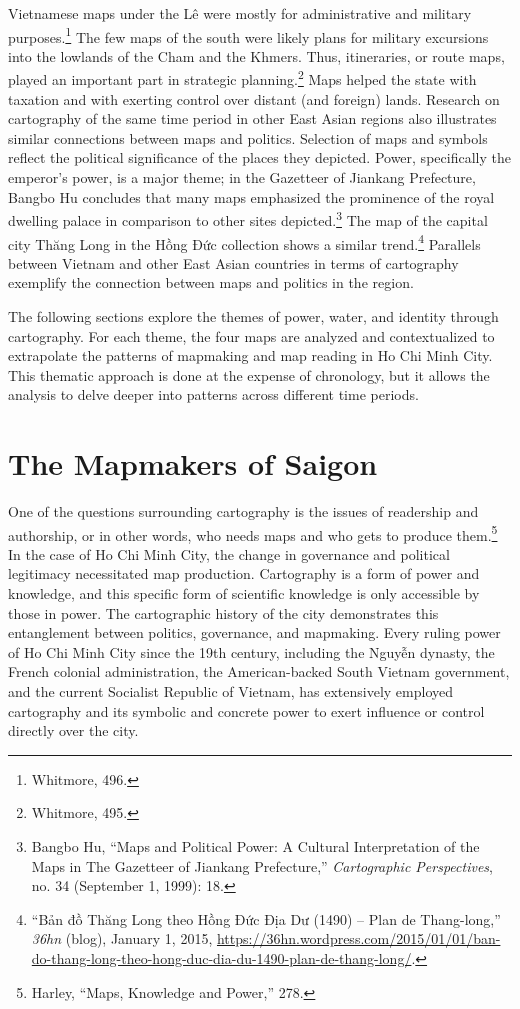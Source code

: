 \vi Vietnamese maps under the Lê were mostly for administrative and military purposes.\footnote{Whitmore, 496.} The few maps of the south were likely plans for military excursions into the lowlands of the Cham and the Khmers. Thus, itineraries, or route maps, played an important part in strategic planning.\footnote{Whitmore, 495.} Maps helped the state with taxation and with exerting control over distant (and foreign) lands. Research on cartography of the same time period in other East Asian regions also illustrates similar connections between maps and politics. Selection of maps and symbols reflect the political significance of the places they depicted. Power, specifically the emperor's power, is a major theme; in the Gazetteer of Jiankang Prefecture, Bangbo Hu concludes that many maps emphasized the prominence of the royal dwelling palace in comparison to other sites depicted.\footnote{Bangbo Hu, “Maps and Political Power: A Cultural Interpretation of the Maps in The Gazetteer of Jiankang Prefecture,” \textit{Cartographic Perspectives}, no. 34 (September 1, 1999): 18.}  The map of the capital city Thăng Long in the Hồng Đức collection shows a similar trend.\footnote{“Bản đồ Thăng Long theo Hồng Đức Địa Dư (1490) – Plan de Thang-long,” \textit{36hn} (blog), January 1, 2015, \url{https://36hn.wordpress.com/2015/01/01/ban-do-thang-long-theo-hong-duc-dia-du-1490-plan-de-thang-long/}.} Parallels between Vietnam and other East Asian countries in terms of cartography exemplify the connection between maps and politics in the region.

The following sections explore the themes of power, water, and identity through cartography. For each theme, the four maps are analyzed and contextualized to extrapolate the patterns of mapmaking and map reading in Ho Chi Minh City. This thematic approach is done at the expense of chronology, but it allows the analysis to delve deeper into patterns across different time periods.

\section{The Mapmakers of Saigon}\label{sec:mapmakers}
One of the questions surrounding cartography is the issues of readership and authorship, or in other words, who needs maps and who gets to produce them.\footnote{Harley, “Maps, Knowledge and Power,” 278.} In the case of Ho Chi Minh City, the change in governance and political legitimacy necessitated map production. Cartography is a form of power and knowledge, and this specific form of scientific knowledge is only accessible by those in power. The cartographic history of the city demonstrates this entanglement between politics, governance, and mapmaking. Every ruling power of Ho Chi Minh City since the 19th century, including the Nguyễn dynasty, the French colonial administration, the American-backed South Vietnam government, and the current Socialist Republic of Vietnam, has extensively employed cartography and its symbolic and concrete power to exert influence or control directly over the city.


